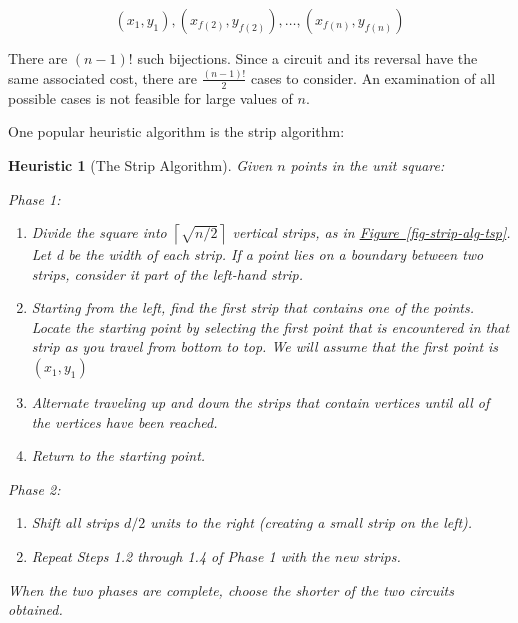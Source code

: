 \documentclass[10pt,]{book}
\theoremstyle{plain}
\newtheorem{heuristic}[theorem]{Heuristic}
\theoremstyle{definition}
\theoremstyle{definition}
\theoremstyle{definition}
\theoremstyle{definition}
\theoremstyle{definition}
\numberwithin{equation}{section}
\begin{document}
\[\left(x_1, y_1\right),\left(x_{f(2)},y_{f(2)}\right),\ldots ,\left(x_{f(n)},y_{f(n)}\right)\]

There are \((n - 1)!\) such bijections.  Since a circuit and its reversal have the same associated cost, there are \(\frac{(n - 1)!}{2}\) cases to consider.  An examination of all possible cases is not feasible for large values of \(n\).%
\par
One popular heuristic algorithm is the strip algorithm: %
\begin{heuristic}[The Strip Algorithm]\label{alg-strip-algorithm}
 Given \(n\) points in the unit square:%
\par
Phase 1:%
\par
\leavevmode%
\begin{enumerate}[label=\alph*]
\item\hypertarget{li-74}{}Divide the square into \(\left\lceil \sqrt{n/2}\right\rceil\) vertical strips, as in \hyperref[fig-strip-alg-tsp]{Figure~\ref{fig-strip-alg-tsp}}. Let d be the width of each strip. If a point lies on a boundary between two strips, consider it part of the left-hand strip.%
\item\hypertarget{li-75}{}Starting from the left, find the first strip that contains one of the points. Locate the starting point by selecting the first point that is encountered in that strip as you travel from bottom to top. We will assume that the first point is \(\left(x_1,y_1\right)\)%
\item\hypertarget{step-1-3}{}Alternate traveling up and down the strips that contain vertices until all of the vertices have been reached.%
\item\hypertarget{li-77}{}Return to the starting point.%
\end{enumerate}
%
\par
Phase 2:%
\par
\leavevmode%
\begin{enumerate}[label=\alph*]
\item\hypertarget{li-78}{}Shift all strips \(d/2\) units to the right (creating a small strip on the left).%
\item\hypertarget{li-79}{}Repeat Steps 1.2 through 1.4 of Phase 1 with the new strips.%
\end{enumerate}
%
\par
When the two phases are complete, choose the shorter of the two circuits obtained.%
\end{heuristic}
\leavevmode%
\end{document}
